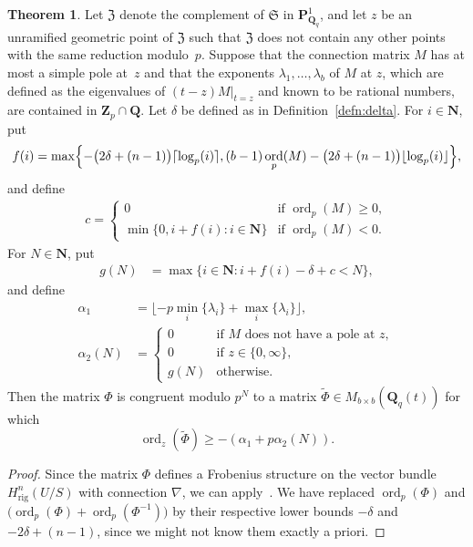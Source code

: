 \documentclass[a4paper,11pt]{article}
\numberwithin{equation}{section}
\newcommand{\NN}{\mathbf{N}} %
\newcommand{\ZZ}{\mathbf{Z}} %
\newcommand{\QQ}{\mathbf{Q}} %
\DeclareMathOperator{\ord}{ord}          %
\providecommand{\Hrig}{H_{\text{rig}}}  %
\theoremstyle{definition}
\newtheorem{thm}{Theorem}[section]
\begin{document}
\begin{thm} \label{thm:KedlayaTuitman}
Let $\mathfrak{Z}$ denote the complement of $\mathfrak{S}$ in 
$\mathbf{P}^{1}_{\mathbf{Q}_q}$, and let $z$ be an unramified geometric point 
of $\mathfrak{Z}$ such that $\mathfrak{Z}$ does not contain any other points 
with the same reduction modulo~$p$. 
Suppose that the connection matrix $M$ has at most a simple pole at~$z$ and that 
the exponents $\lambda_1, \dotsc, \lambda_{b}$ of $M$ at $z$, which are defined 
as the eigenvalues of $(t - z) M \vert_{t=z}$ and known to be rational numbers, are 
contained in $\ZZ_p \cap \QQ$. Let $\delta$ be defined as in 
Definition~\ref{defn:delta}. For $i \in \NN$, put
\begin{align*}
f(i) = \max \Bigl\{ -\bigl(2 \delta + (n-1) \bigr) \lceil \log_p(i) \rceil, 
(b-1) \ord_p(M) -\bigl(2 \delta + (n-1) \bigr) \lfloor \log_p(i) \rfloor 
\Bigr\},
\end{align*}
and define 
\begin{align*}
c = \begin{cases}
0 & \mbox{if $\ord_p(M) \geq 0$}, \\
\min\{0, i + f(i): i \in \NN\} & \mbox{if $\ord_p(M) < 0$}.
\end{cases}
\end{align*}
For $N \in \NN$, put
\begin{align*}
g(N) &= \max \{i \in \NN : i + f(i) - \delta + c  < N \},
\end{align*}
and define
\begin{align*}
\alpha_1    &= \lfloor -p \min_i \{ \lambda_i \} + \max_{i} \{\lambda_i\} \rfloor, \\ 
\alpha_2(N) &=  \left \{ 
         \begin{array}{cl}
         0  & \mbox{if $M$ does not have a pole at $z$},  \\
         0  & \mbox{if $z \in \{0,\infty \}$}, \\
         g(N) & \mbox{otherwise}.
         \end{array}
         \right. 
\end{align*}
Then the matrix $\Phi$ is congruent modulo $p^{N}$ to a matrix 
$\tilde{\Phi} \in M_{b \times b}(\QQ_q(t))$ for which
\begin{equation*}
\ord_z(\tilde{\Phi}) \geq -(\alpha_1+p \alpha_2(N)).
\end{equation*}
\end{thm}

\begin{proof}
Since the matrix $\Phi$ defines a Frobenius structure on the vector 
bundle $\Hrig^n(U/S)$ with connection $\nabla$, we can 
apply~\citep[Theorem~2.1]{KedlayaTuitman2012}. We have 
replaced $\ord_p(\Phi)$ and $ \bigl( \ord_p(\Phi)+\ord_p(\Phi^{-1}) \bigr)$ 
by their respective lower bounds $-\delta$ and $-2 \delta + (n-1)$, since 
we might not know them exactly a priori.
\end{proof}
\end{document}
